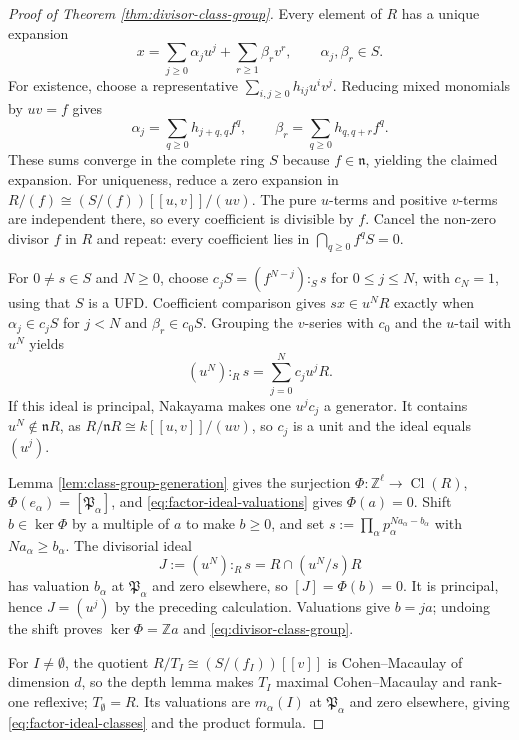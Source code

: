 \documentclass[a4paper,reqno]{amsart}
\def\n{\mathfrak{n}}
\DeclareMathOperator{\Cl}{Cl}
\theoremstyle{definition}
\begin{document}
\begin{proof}[Proof of Theorem \ref{thm:divisor-class-group}]
Every element of $R$ has a unique expansion
\[
x=\sum_{j\ge0}\alpha_ju^j+\sum_{r\ge1}\beta_rv^r,
\qquad\alpha_j,\beta_r\in S.
\]
For existence, choose a representative $\sum_{i,j\ge0}h_{ij}u^iv^j$. Reducing mixed monomials by $uv=f$ gives
\[
\alpha_j=\sum_{q\ge0}h_{j+q,q}f^q,
\qquad
\beta_r=\sum_{q\ge0}h_{q,q+r}f^q.
\]
These sums converge in the complete ring $S$ because $f\in\n$, yielding the claimed expansion. For uniqueness, reduce a zero expansion in $R/(f)\cong(S/(f))[[u,v]]/(uv)$. The pure $u$-terms and positive $v$-terms are independent there, so every coefficient is divisible by $f$. Cancel the non-zero divisor $f$ in $R$ and repeat: every coefficient lies in $\bigcap_{q\ge0}f^qS=0$.

For $0\ne s\in S$ and $N\ge0$, choose $c_jS=(f^{N-j}):_Ss$ for $0\le j\le N$, with $c_N=1$, using that $S$ is a UFD. Coefficient comparison gives $sx\in u^NR$ exactly when $\alpha_j\in c_jS$ for $j<N$ and $\beta_r\in c_0S$. Grouping the $v$-series with $c_0$ and the $u$-tail with $u^N$ yields
\begin{equation}\label{eq:power-colon-generators}
(u^N):_Rs=\sum_{j=0}^N c_ju^jR.
\end{equation}
If this ideal is principal, Nakayama makes one $u^jc_j$ a generator. It contains $u^N\notin\n R$, as $R/\n R\cong k[[u,v]]/(uv)$, so $c_j$ is a unit and the ideal equals $(u^j)$.

Lemma \ref{lem:class-group-generation} gives the surjection $\Phi\colon\mathbb Z^\ell\to\Cl(R)$, $\Phi(e_\alpha)=[\mathfrak P_\alpha]$, and \eqref{eq:factor-ideal-valuations} gives $\Phi(a)=0$. Shift $b\in\ker\Phi$ by a multiple of $a$ to make $b\ge0$, and set $s:=\prod_\alpha p_\alpha^{Na_\alpha-b_\alpha}$ with $Na_\alpha\ge b_\alpha$. The divisorial ideal
\[
J:=(u^N):_Rs=R\cap(u^N/s)R
\]
has valuation $b_\alpha$ at $\mathfrak P_\alpha$ and zero elsewhere, so $[J]=\Phi(b)=0$. It is principal, hence $J=(u^j)$ by the preceding calculation. Valuations give $b=ja$; undoing the shift proves $\ker\Phi=\mathbb Za$ and \eqref{eq:divisor-class-group}.

For $I\ne\emptyset$, the quotient $R/T_I\cong(S/(f_I))[[v]]$ is Cohen--Macaulay of dimension $d$, so the depth lemma makes $T_I$ maximal Cohen--Macaulay and rank-one reflexive; $T_\emptyset=R$. Its valuations are $m_\alpha(I)$ at $\mathfrak P_\alpha$ and zero elsewhere, giving \eqref{eq:factor-ideal-classes} and the product formula.
\end{proof}
\end{document}
